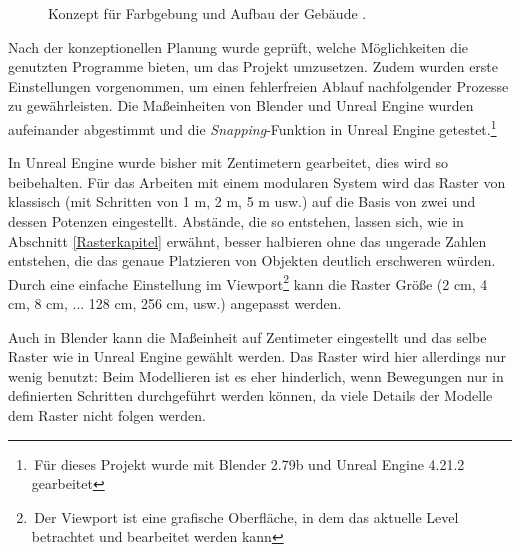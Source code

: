\begin{figure}[!h]
\centering
  \caption{Konzept für Farbgebung und Aufbau der Gebäude \parencite{JapanConcept}.}
	\label{JapanKonzept}
\end{figure}
\newpage
Nach der konzeptionellen Planung wurde geprüft, welche Möglichkeiten die genutzten Programme bieten, um das Projekt umzusetzen. Zudem wurden erste Einstellungen vorgenommen, um einen fehlerfreien Ablauf nachfolgender Prozesse zu gewährleisten. Die Maßeinheiten von Blender und Unreal Engine wurden aufeinander abgestimmt und die \textit{Snapping}-Funktion in Unreal Engine getestet.\footnote{\,Für dieses Projekt wurde mit Blender 2.79b und Unreal Engine 4.21.2 gearbeitet}
\par
In Unreal Engine wurde bisher mit Zentimetern gearbeitet, dies wird so beibehalten. Für das Arbeiten mit einem modularen System wird das Raster von klassisch (mit Schritten von 1 m, 2 m, 5 m usw.) auf die Basis von zwei und dessen Potenzen eingestellt. Abstände, die so entstehen, lassen sich, wie in Abschnitt \ref{Rasterkapitel} erwähnt, besser halbieren ohne das ungerade Zahlen entstehen, die das genaue Platzieren von Objekten deutlich erschweren würden. Durch eine einfache Einstellung im Viewport\footnote{\,Der Viewport ist eine grafische Oberfläche, in dem das aktuelle Level betrachtet und bearbeitet werden kann} kann die Raster Größe (2 cm, 4 cm, 8 cm, ... 128 cm, 256 cm, usw.) angepasst werden.
\par
Auch in Blender kann die Maßeinheit auf Zentimeter eingestellt und das selbe Raster wie in Unreal Engine gewählt werden. Das Raster wird hier allerdings nur wenig benutzt: Beim Modellieren ist es eher hinderlich, wenn Bewegungen nur in definierten Schritten durchgeführt werden können, da viele Details der Modelle dem Raster nicht folgen werden.
